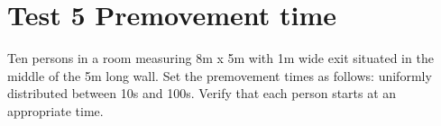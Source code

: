 \section*{Test 5 Premovement time}
Ten persons in a room measuring 8m x 5m with 1m wide exit situated in the middle of the 5m long wall. Set the premovement times as follows: uniformly distributed between 10s and 100s. Verify that each person starts at an appropriate time.




